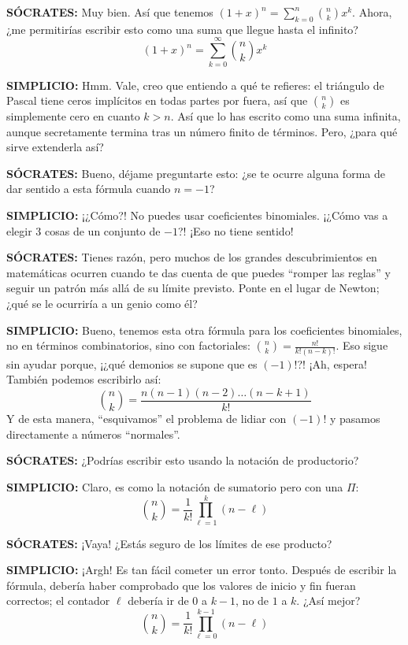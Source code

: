 \noindent \textbf{SÓCRATES:} Muy bien. Así que tenemos
$(1 + x)^n = \sum_{k=0}^{n} \binom{n}{k} x^k$. Ahora, ¿me permitirías
escribir esto como una suma que llegue hasta el infinito?
\[ (1 + x)^n = \sum_{k=0}^{\infty} \binom{n}{k} x^k \]

\noindent \textbf{SIMPLICIO:} Hmm. Vale, creo que entiendo a qué te
refieres: el triángulo de Pascal tiene ceros implícitos en todas partes
por fuera, así que $\binom{n}{k}$ es simplemente cero en cuanto $k >
n$. Así que lo has escrito como una suma infinita, aunque secretamente
termina tras un número finito de términos. Pero, ¿para qué sirve
extenderla así?

\noindent \textbf{SÓCRATES:} Bueno, déjame preguntarte esto: ¿se te
ocurre alguna forma de dar sentido a esta fórmula cuando $n = -1$?

\noindent \textbf{SIMPLICIO:} ¡¿Cómo?! No puedes usar coeficientes
binomiales. ¡¿Cómo vas a elegir 3 cosas de un conjunto de $-1$?! ¡Eso no
tiene sentido!

\noindent \textbf{SÓCRATES:} Tienes razón, pero muchos de los grandes
descubrimientos en matemáticas ocurren cuando te das cuenta de que
puedes ``romper las reglas'' y seguir un patrón más allá de su límite
previsto. Ponte en el lugar de Newton; ¿qué se le ocurriría a un genio
como él?

\noindent \textbf{SIMPLICIO:} Bueno, tenemos esta otra fórmula para los
coeficientes binomiales, no en términos combinatorios, sino con
factoriales: $\binom{n}{k} = \frac{n!}{k!(n-k)!}$. Eso sigue sin ayudar
porque, ¡¿qué demonios se supone que es $(-1)!$?! ¡Ah, espera! También
podemos escribirlo así:
\[ \binom{n}{k} = \frac{n(n - 1)(n - 2) \dots (n - k + 1)}{k!} \] Y de
esta manera, ``esquivamos'' el problema de lidiar con $(-1)!$ y pasamos
directamente a números ``normales''.

\noindent \textbf{SÓCRATES:} ¿Podrías escribir esto usando la notación
de productorio?

\noindent \textbf{SIMPLICIO:} Claro, es como la notación de sumatorio
pero con una $\Pi$:
\[ \binom{n}{k} = \frac{1}{k!} \prod_{\ell=1}^{k} (n - \ell) \]

\noindent \textbf{SÓCRATES:} ¡Vaya! ¿Estás seguro de los límites de ese
producto?

\noindent \textbf{SIMPLICIO:} ¡Argh! Es tan fácil cometer un error
tonto. Después de escribir la fórmula, debería haber comprobado que los
valores de inicio y fin fueran correctos; el contador $\ell$ debería ir de
$0$ a $k - 1$, no de $1$ a $k$. ¿Así mejor?
\[ \binom{n}{k} = \frac{1}{k!} \prod_{\ell=0}^{k-1} (n - \ell) \]


